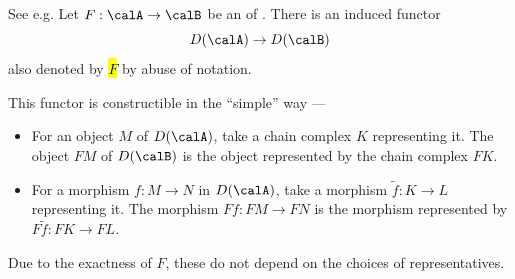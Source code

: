 \begin{proposition}{See e.g. {\cite[10.5.2]{weibel}}} \label{proposition:exact_functor_between_abelian_categories_induces_functor_on_derived_categories}
    Let $F: \calA \to \calB$ be an  of . There is an induced functor 
    $$D(\calA) \to D(\calB)$$
     also denoted by \hl{$F$} by abuse of notation. 
    
    This functor is constructible in the ``simple'' way --- \begin{itemize}
        \item For an object $M$ of $D(\calA)$, take a chain complex $K$ representing it. The object $FM$ of $D(\calB)$ is the object represented by the chain complex $FK$. 
        \item For a morphism $f: M \to N$ in $D(\calA)$, take a morphism $\tilde{f}: K \to L$ representing it. The morphism $Ff: FM \to FN$ is the morphism represented by $F\tilde{f}: FK \to FL$. 
    \end{itemize}
    Due to the exactness of $F$, these do not depend on the choices of representatives.
\end{proposition}